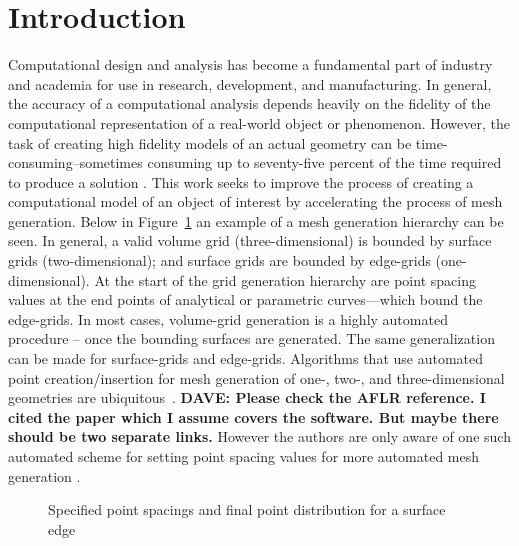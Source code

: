 \section{Introduction}
Computational design and analysis has become a 
fundamental part of industry and academia for use in research, 
development, and manufacturing. In general, the accuracy of a 
computational analysis depends heavily on the fidelity of the 
computational representation of a real-world object or phenomenon. 
However, the task of creating high fidelity models of an actual geometry 
can be time-consuming--sometimes consuming up to seventy-five percent of 
the time required to produce a solution \cite{bischoff05}. This work seeks 
to improve the process of creating a computational model of an object of 
interest by accelerating the process of mesh generation. Below in 
Figure~\ref{GridGenerationProcess} an example of a mesh generation 
hierarchy can be seen. In general, a valid volume grid (three-dimensional) 
is bounded by surface grids (two-dimensional); and surface grids are 
bounded by edge-grids (one-dimensional). At the start of the grid 
generation hierarchy are point spacing values at the end points of 
analytical or parametric curves—which bound the edge-grids. In most cases, 
volume-grid generation is a highly automated procedure -- once the 
bounding surfaces are generated. The same generalization can be made for 
surface-grids and edge-grids. Algorithms that use automated point 
creation/insertion for mesh generation of one-, two-, and 
three-dimensional geometries are ubiquitous~\cite{cubit,delaunay,aflr}.
{\bf{DAVE:  Please check the AFLR reference.  I cited the paper which
I assume covers the software.  But maybe there should be two separate
links.}}  However the authors are only aware of one such automated scheme 
for setting point spacing values for more automated mesh generation \cite{mclaurin12}.\\

\begin{figure}[h!]
 \caption{\label{GridGenerationProcess} Specified point spacings and final point distribution for a surface edge \cite{thompson98}}
\end{figure}

